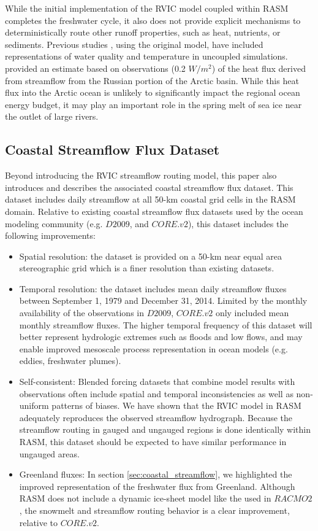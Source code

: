 \documentclass[jgrga, draft]{agutex}
\begin{document}
\begin{article}
While the initial implementation of the RVIC model coupled within RASM completes the freshwater cycle, it also does not provide explicit mechanisms to deterministically route other runoff properties, such as heat, nutrients, or sediments.
Previous studies \citep[e.g.][]{vanVliet_2011,vanVliet_2012}, using the original \citet{Lohmann_1996} model, have included representations of water quality and temperature in uncoupled simulations.
\citet{Lammers_2007} provided an estimate based on observations (0.2 $W/m^2$) of the heat flux derived from streamflow from the Russian portion of the Arctic basin.
While this heat flux into the Arctic ocean is unlikely to significantly impact the regional ocean energy budget, it may play an important role in the spring melt of sea ice near the outlet of large rivers.

\subsection{Coastal Streamflow Flux Dataset}
Beyond introducing the RVIC streamflow routing model, this paper also introduces and describes the associated coastal streamflow flux dataset.
This dataset includes daily streamflow at all 50-km coastal grid cells in the RASM domain.
Relative to existing coastal streamflow flux datasets used by the ocean modeling community (e.g. $D2009$, and $CORE.v2$), this dataset includes the following improvements:

\begin{itemize}[leftmargin=+.5in]
  \item Spatial resolution: the dataset is provided on a 50-km near equal area stereographic grid which is a finer resolution than existing datasets.
  \item Temporal resolution: the dataset includes mean daily streamflow fluxes between September 1, 1979 and December 31, 2014. Limited by the monthly availability of the observations in $D2009$, $CORE.v2$ only included mean monthly streamflow fluxes.
  The higher temporal frequency of this dataset will better represent hydrologic extremes such as floods and low flows, and may enable improved mesoscale process representation in ocean models (e.g. eddies, freshwater plumes).
  \item Self-consistent: Blended forcing datasets that combine model results with observations often include spatial and temporal inconsistencies as well as non-uniform patterns of biases. We have shown that the RVIC model in RASM adequately reproduces the observed streamflow hydrograph. Because the streamflow routing in gauged and ungauged regions is done identically within RASM, this dataset should be expected to have similar performance in ungauged areas.
  \item Greenland fluxes: In section \ref{sec:coastal_streamflow}, we highlighted the improved representation of the freshwater flux from Greenland. Although RASM does not include a dynamic ice-sheet model like the used in $RACMO2$, the snowmelt and streamflow routing behavior is a clear improvement, relative to $CORE.v2$.
\end{itemize}


\end{article}
\end{document}
